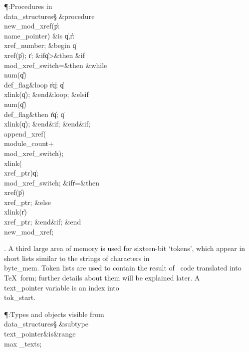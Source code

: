 \Y\P\?\4:Procedures in \\{data\_structures}\X\mathrel{+}\S\?\6
\&{procedure}\8\1\\{new\_mod\_xref}\?(\1\?\|p\?:\?\\{name\_pointer}\?\2)\?\2\8%
\&{is}\8\1\6
\|q\?,\?\|r\?:\?\\{xref\_number};\6
\4\&{begin}\6
\|q\?\K\?\\{xref}\?\1(\?\|p\?\2)\?;\5
\|r\?\K{};\6
\&{if}\1\1\8\|q\?>\2\8\&{then}\6
\&{if}\1\1\8\\{mod\_xref\_switch}\?=\2\8\&{then}\6
\1\&{while}\8\\{num}\?\1(\?\|q\?\2)\G\?\\{def\_flag}\8\&{loop}\6
\|r\?\K\?\|q;\5
\|q\?\K\?\\{xlink}\?\1(\?\|q\?\2)\?;\2\6
\&{end}\8\&{loop};\6
\4\&{elsif}\1\8\\{num}\?\1(\?\|q\?\2)\G\?\\{def\_flag}\2\8\&{then}\6
\|r\?\K\?\|q;\5
\|q\?\K\?\\{xlink}\?\1(\?\|q\?\2)\?;\2\6
\&{end}\8\2\&{if}\1;\2\6
\&{end}\8\2\&{if}\1;\6
\\{append\_xref}\?\1(\?\\{module\_count}\?+\?\\{mod\_xref\_switch}\?\2)\?;\5
\\{xlink}\?\1(\?\\{xref\_ptr}\?\2)\K\?\|q;\5
\\{mod\_xref\_switch}\?\K{};\6
\&{if}\1\1\8\|r\?=\2\8\&{then}\6
\\{xref}\?\1(\?\|p\?\2)\K\?\\{xref\_ptr};\6
\4\&{else}\6
\\{xlink}\?\1(\?\|r\?\2)\K\?\\{xref\_ptr};\2\6
\&{end}\8\2\&{if}\1;\2\6
\&{end}\8\\{new\_mod\_xref};\par
\fi

. A third large area of memory is used for sixteen-bit `tokens', which
appear
in short lists similar to the strings of characters in \\{byte\_mem}. Token
lists
are used to contain the result of \ADA\ code translated into \TeX\ form;
further details about them will be explained later. A \\{text\_pointer}
variable
is an index into \\{tok\_start}.

\Y\P\?\4:Types and objects visible from \\{data\_structures}\X\mathrel{+}\S%
\?\6
\&{subtype}\8\\{text\_pointer}\8\&{is}\8\8\&{range}\?\to\?\\{max%
\_texts};\par
\fi

